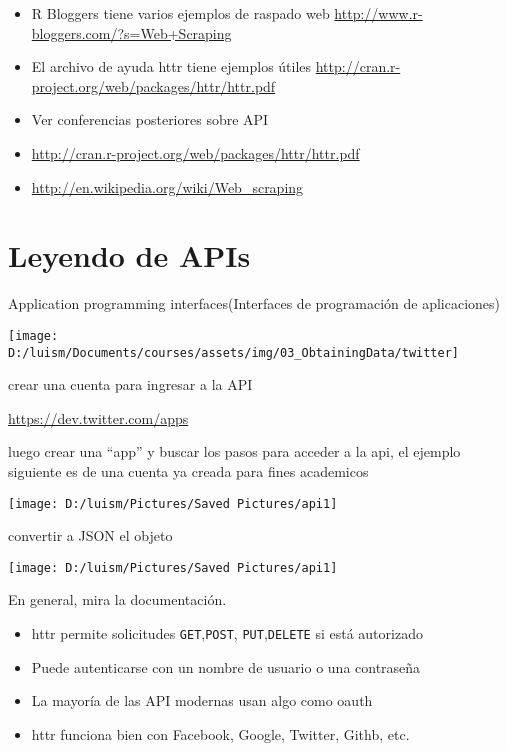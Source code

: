 \documentclass[
]{article}
\providecommand{\tightlist}{%
  \setlength{\itemsep}{0pt}\setlength{\parskip}{0pt}}
\begin{document}
\begin{itemize}
\tightlist
\item
  R Bloggers tiene varios ejemplos de raspado web
  \url{http://www.r-bloggers.com/?s=Web+Scraping}
\item
  El archivo de ayuda httr tiene ejemplos útiles
  \href{http://cran.r-project.org/web/packages/httr/\%20httr.pdf}{http://cran.r-project.org/web/packages/httr/httr.pdf}
\item
  Ver conferencias posteriores sobre API
\item
  \url{http://cran.r-project.org/web/packages/httr/httr.pdf}
\item
  \url{http://en.wikipedia.org/wiki/Web_scraping}
\end{itemize}

\hypertarget{leyendo-de-apis}{%
\section{Leyendo de APIs}\label{leyendo-de-apis}}

Application programming interfaces(Interfaces de programación de
aplicaciones)

\begin{center}\texttt{[image: D:/luism/Documents/courses/assets/img/03\_ObtainingData/twitter]} \end{center}

crear una cuenta para ingresar a la API

\url{https://dev.twitter.com/apps}

luego crear una ``app'' y buscar los pasos para acceder a la api, el
ejemplo siguiente es de una cuenta ya creada para fines academicos

\begin{center}\texttt{[image: D:/luism/Pictures/Saved Pictures/api1]} \end{center}

convertir a JSON el objeto

\begin{center}\texttt{[image: D:/luism/Pictures/Saved Pictures/api1]} \end{center}

En general, mira la documentación.

\begin{itemize}
\tightlist
\item
  httr permite solicitudes \texttt{GET},\texttt{POST},
  \texttt{PUT},\texttt{DELETE} si está autorizado
\item
  Puede autenticarse con un nombre de usuario o una contraseña
\item
  La mayoría de las API modernas usan algo como oauth
\item
  httr funciona bien con Facebook, Google, Twitter, Githb, etc.
\end{itemize}
\end{document}
